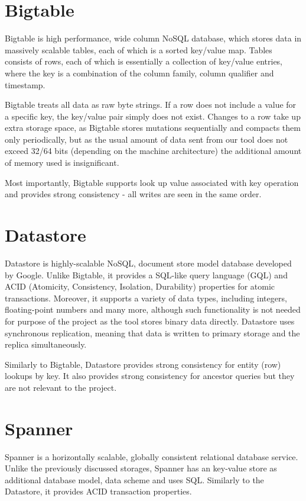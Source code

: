 \documentclass[bsc,frontabs,twoside,singlespacing,parskip,deptreport]{infthesis}     %
\begin{document}
\section{Bigtable}

Bigtable \citep{google-bigtable} is high performance, wide column NoSQL database, which stores data in massively scalable tables, each of which is a sorted key/value map. Tables consists of rows, each of which is essentially a collection of key/value entries, where the key is a combination of the column family, column qualifier and timestamp. 

Bigtable treats all data as raw byte strings. If a row does not include a value for a specific key, the key/value pair simply does not exist. Changes to a row take up extra storage space, as Bigtable stores mutations sequentially and compacts them only periodically, but as the usual amount of data sent from our tool does not exceed 32/64 bits (depending on the machine architecture) the additional amount of memory used is insignificant. 

Most importantly, Bigtable supports look up value associated with key operation and provides strong consistency - all writes are seen in the same order.

\section{Datastore}

Datastore \citep{google-datastore} is highly-scalable NoSQL, document store model database developed by Google. Unlike Bigtable, it provides a SQL-like query language (GQL) and ACID (Atomicity, Consistency, Isolation, Durability) properties for atomic transactions. Moreover, it supports a variety of data types, including integers, floating-point numbers and many more, although such functionality is not needed for purpose of the project as the tool stores binary data directly. Datastore uses synchronous replication, meaning that data is written to primary storage and the replica simultaneously.

Similarly to Bigtable, Datastore provides strong consistency for entity (row) lookups by key. It also provides strong consistency for ancestor queries but they are not relevant to the project.

\section{Spanner}

Spanner \citep{google-spanner} is a horizontally scalable, globally consistent relational database service. Unlike the previously discussed storages, Spanner has an key-value store as additional database model, data scheme and uses SQL. Similarly to the Datastore, it provides ACID transaction properties.
\end{document}
